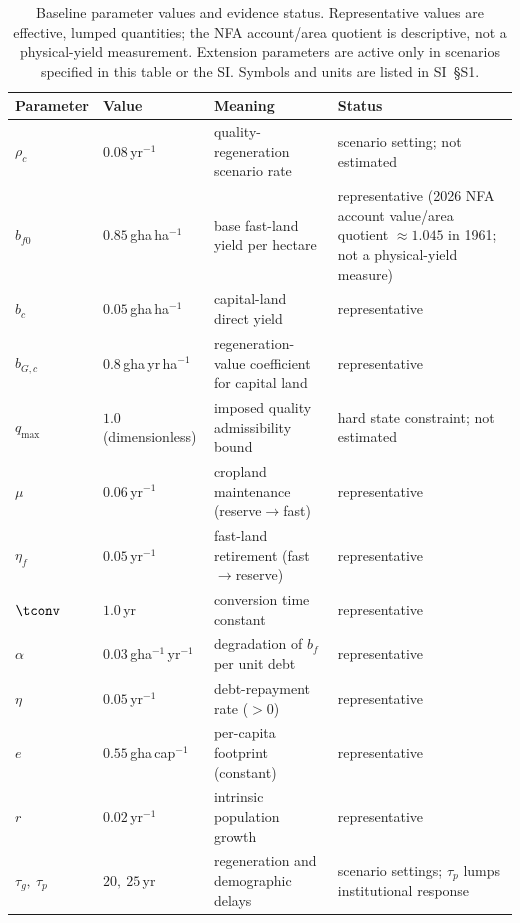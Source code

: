\begin{table}[!htbp]
\centering\footnotesize
\renewcommand{\arraystretch}{0.95}
\caption{Baseline parameter values and evidence status. Representative values are effective, lumped quantities; the NFA account/area quotient is descriptive, not a physical-yield measurement. Extension parameters are active only in scenarios specified in this table or the SI. Symbols and units are listed in SI~\S S1.}
\label{tab:params}
\setlength{\tabcolsep}{4pt}
\begin{tabularx}{\textwidth}{@{}>{\raggedright\arraybackslash}p{} >{\raggedright\arraybackslash}p{} >{\raggedright\arraybackslash}X >{\raggedright\arraybackslash}p{}@{}}
\toprule
Parameter & Value & Meaning & Status \\
\midrule
$\rho_c$ & $0.08$\,yr$^{-1}$ & quality-regeneration scenario rate & scenario setting; not estimated \\
$b_{f0}$ & $0.85$\,gha\,ha$^{-1}$ & base fast-land yield per hectare & representative (2026 NFA account value/area quotient $\approx1.045$ in 1961; not a physical-yield measure) \\
$b_c$ & $0.05$\,gha\,ha$^{-1}$ & capital-land direct yield & representative \\
$b_{G,c}$ & $0.8$\,gha\,yr\,ha$^{-1}$ & regeneration-value coefficient for capital land & representative \\
$q_{\max}$ & $1.0$ (dimensionless) & imposed quality admissibility bound & hard state constraint; not estimated \\
$\mu$ & $0.06$\,yr$^{-1}$ & cropland maintenance (reserve$\to$fast) & representative \\
$\eta_f$ & $0.05$\,yr$^{-1}$ & fast-land retirement (fast$\to$reserve) & representative \\
$\tconv$ & $1.0$\,yr & conversion time constant & representative \\
$\alpha$ & $0.03$\,gha$^{-1}$\,yr$^{-1}$ & degradation of $b_f$ per unit debt & representative \\
$\eta$ & $0.05$\,yr$^{-1}$ & debt-repayment rate ($>0$) & representative \\
$e$ & $0.55$\,gha\,cap$^{-1}$ & per-capita footprint (constant) & representative \\
$r$ & $0.02$\,yr$^{-1}$ & intrinsic population growth & representative \\
$\tau_g,\ \tau_p$ & $20,\ 25$\,yr & regeneration and demographic delays & scenario settings; $\tau_p$ lumps institutional response \\

\end{tabularx}
\end{table}
